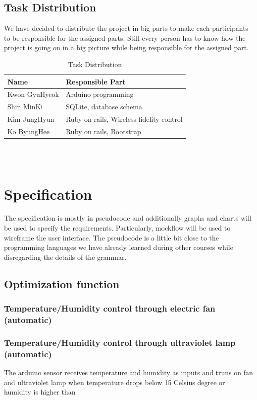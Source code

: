 \documentclass[conference]{IEEEtran}
\begin{document}
\subsection{Task Distribution}
We have decided to distribute the project in big parts to make each participants to be responsible for the assigned parts. Still every person has to know how the project is going on in a big picture while being responsible for the assigned part.
\begin{table}[H]
\renewcommand{\arrayrulewidth}{1pt}
\renewcommand{\arraystretch}{2.5}
\begin{tabular}
{|p{4cm}|p{4cm}|}\hline
Name & Responsible Part\\ \hline
Kwon GyuHyeok&Arduino programming\\ \hline
Shin MinKi&SQLite, database schema\\ \hline
Kim JungHyun&Ruby on rails, Wireless fidelity control\\ \hline
Ko ByungHee&Ruby on rails, Bootstrap\\ \hline
\end{tabular}
\\
\\
\caption{Task Distribution}
\label{tab:template}
\end{table}

\section{Specification}
The specification is mostly in pseudocode and additionally graphs and charts will be used to specify the requirements. Particularly, mockflow will be used to wireframe the user interface. The pseudocode is a little bit close to the programming languages we have already learned during other courses while disregarding the details of the grammar.
\subsection{Optimization function}
\subsubsection{Temperature/Humidity control through electric fan (automatic)}
\subsubsection{Temperature/Humidity control through ultraviolet lamp (automatic)}
The arduino sensor receives temperature and humidity as inputs and truns on fan and ultraviolet lamp when temperature drops below 15 Celsius degree or humidity is higher than 
\end{document}
